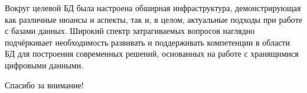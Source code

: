 Вокруг целевой БД была настроена обширная инфраструктура, демонстрирующая как различные нюансы и аспекты, так
и, в целом, актуальные подходы при работе с базами данных.
Широкий спектр затрагиваемых вопросов наглядно подчёркивает необходимость развивать и поддерживать
компетенции в области БД для построения современных решений, основанных на работе с хранящимися цифровыми данными.

Спасибо за внимание!